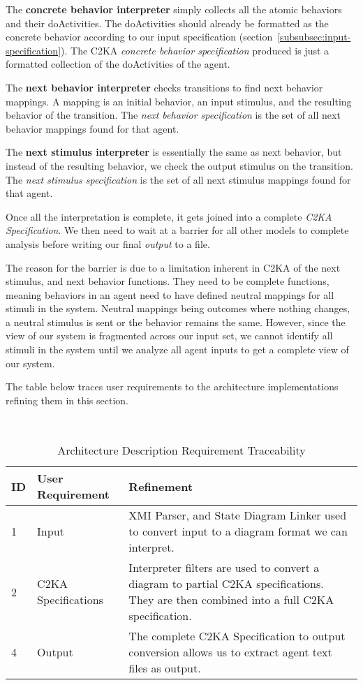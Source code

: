 \documentclass[11pt]{article}
\begin{document}
    The \textbf{concrete behavior interpreter} simply collects all the atomic behaviors and their doActivities.
    The doActivities should already be formatted as the concrete behavior according to our input specification (section~\ref{subsubsec:input-specification}).
    The C2KA \textit{concrete behavior specification} produced is just a formatted collection of the doActivities of the agent.

    The \textbf{next behavior interpreter} checks transitions to find next behavior mappings.
    A mapping is an initial behavior, an input stimulus, and the resulting behavior of the transition.
    The \textit{next behavior specification} is the set of all next behavior mappings found for that agent.

    The \textbf{next stimulus interpreter} is essentially the same as next behavior,
    but instead of the resulting behavior, we check the output stimulus on the transition.
    The \textit{next stimulus specification} is the set of all next stimulus mappings found for that agent.

    Once all the interpretation is complete, it gets joined into a complete \textit{C2KA Specification}.
    We then need to wait at a barrier for all other models to complete analysis before writing our final \textit{output} to a file.

    The reason for the barrier is due to a limitation inherent in C2KA of the next stimulus, and next behavior functions.
    They need to be complete functions,
    meaning behaviors in an agent need to have defined neutral mappings for all stimuli in the system.
    Neutral mappings being outcomes where nothing changes, a neutral stimulus is sent or the behavior remains the same.
    However, since the view of our system is fragmented across our input set,
    we cannot identify all stimuli in the system until we analyze all agent inputs to get a complete view of our system.


    The table below traces user requirements to the architecture implementations refining them in this section.
    \begin{table}[htbp]
        \centering
        \caption{Architecture Description Requirement Traceability}\label{tab:arch-description-table}\\
        \begin{tabularx}{\textwidth}{| l | l | X |}
            \hline
            \textbf{ID} & \textbf{User Requirement} & \textbf{Refinement} \\
            \hline
            1 & Input & XMI Parser, and State Diagram Linker used to convert input to a diagram format we can interpret. \\ \hline
            2 & C2KA Specifications & Interpreter filters are used to convert a diagram to partial C2KA specifications.
            They are then combined into a full C2KA specification. \\ \hline
            4 & Output & The complete C2KA Specification to output conversion allows us to extract agent text files as output.  \\ \hline
        \end{tabularx}
    \end{table}
\end{document}
